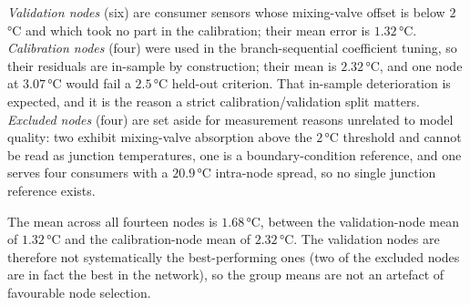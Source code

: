 \documentclass[a4paper,fleqn]{cas-sc}
\begin{document}
\emph{Validation nodes} (six) are consumer sensors whose mixing-valve offset is below
$2$\,°C and which took no part in the calibration; their mean error is $1.32$\,°C.
\emph{Calibration nodes} (four) were used in the branch-sequential coefficient tuning, so
their residuals are in-sample by construction; their mean is $2.32$\,°C, and one node at
$3.07$\,°C would fail a $2.5$\,°C held-out criterion. That in-sample deterioration is
expected, and it is the reason a strict calibration/validation split matters.
\emph{Excluded nodes} (four) are set aside for measurement reasons unrelated to model
quality: two exhibit mixing-valve absorption above the $2$\,°C threshold and cannot be read
as junction temperatures, one is a boundary-condition reference, and one serves four
consumers with a $20.9$\,°C intra-node spread, so no single junction reference exists.

The mean across all fourteen nodes is $1.68$\,°C, between the validation-node mean of
$1.32$\,°C and the calibration-node mean of $2.32$\,°C. The validation nodes are therefore
not systematically the best-performing ones (two of the excluded nodes are in fact the
best in the network), so the group means are not an artefact of favourable node selection.
\end{document}
